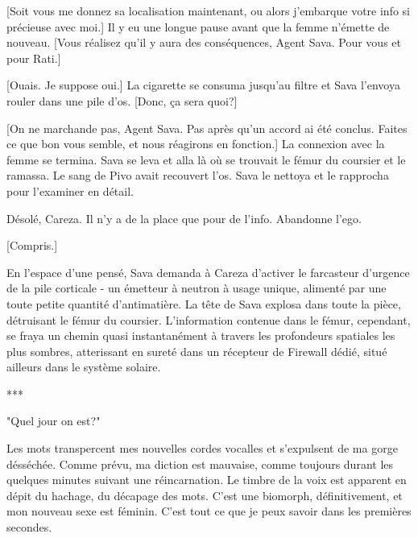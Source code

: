 [Soit vous me donnez sa localisation maintenant, ou alors j'embarque votre info si précieuse avec moi.] Il y eu une longue pause avant que la femme n'émette de nouveau. [Vous réalisez qu'il y aura des conséquences, Agent Sava. Pour vous et pour Rati.] 

[Ouais. Je suppose oui.] La cigarette se consuma jusqu'au filtre et Sava l'envoya rouler dans une pile d'os. [Donc, ça sera quoi?] 

[On ne marchande pas, Agent Sava. Pas après qu'un accord ai été conclus. Faites ce que bon vous semble, et nous réagirons en fonction.] La connexion avec la femme se termina. Sava se leva et alla là où se trouvait le fémur du coursier et le ramassa. Le sang de Pivo avait recouvert l'os. Sava le nettoya et le rapprocha pour l'examiner en détail. 

Désolé, Careza. Il n'y a de la place que pour de l'info. Abandonne l'ego. 

[Compris.] 

En l'espace d'une pensé, Sava demanda à Careza d'activer le farcasteur d'urgence de la pile corticale - un émetteur à neutron à usage unique, alimenté par une toute petite quantité d'antimatière. La tête de Sava explosa dans toute la pièce, détruisant le fémur du coursier. L'information contenue dans le fémur, cependant, se fraya un chemin quasi instantanément à travers les profondeurs spatiales les plus sombres, atterissant en sureté dans un récepteur de Firewall dédié, situé ailleurs dans le système solaire. 

\begin{center} *** \end{center} 

"Quel jour on est?" 

Les mots transpercent mes nouvelles cordes vocalles et s'expulsent de ma gorge désséchée. Comme prévu, ma diction est mauvaise, comme toujours durant les quelques minutes suivant une réincarnation. Le timbre de la voix est apparent en dépit du hachage, du décapage des mots. C'est une biomorph, définitivement, et mon nouveau sexe est féminin. C'est tout ce que je peux savoir dans les premières secondes. 



